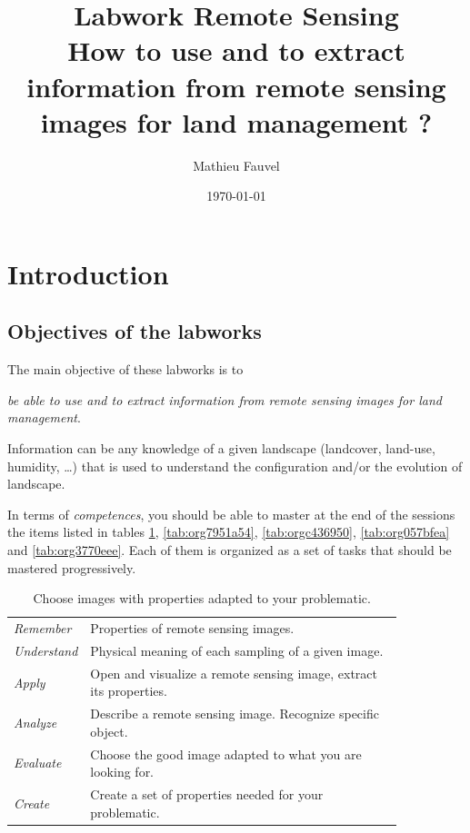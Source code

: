 \documentclass[a4paper,11pt,DIV=18]{scrartcl}
\author{Mathieu Fauvel}
\date{\today}
\title{Labwork Remote Sensing\\\medskip
\large How to use and to extract information from remote sensing images for land management ?}
\begin{document}
\maketitle
\setcounter{tocdepth}{2}
\tableofcontents

\section{Introduction}
\label{sec:org3ef3c04}
\subsection{Objectives of the labworks}
\label{sec:org4323aba}
The main objective of these labworks is to
\begin{center}
\emph{be able to  use and to extract information from  remote sensing images
for land management}.
\end{center}
Information  can be  any knowledge  of a  given landscape  (landcover,
land-use, humidity, \ldots{})  that is used to understand the configuration
and/or the evolution of landscape.

In terms of  \emph{competences}, you should be  able to master at  the end of
the sessions  the items listed in  tables \ref{tab:org80b3081}, \ref{tab:org7951a54}, \ref{tab:orgc436950},  \ref{tab:org057bfea} and \ref{tab:org3770eee}.
Each of them  is organized as a  set of tasks that  should be mastered
progressively.

\begin{table}[htbp]
\caption{\label{tab:org80b3081}
Choose images with properties adapted to your problematic.}
\centering
\begin{tabular}{lp{0.85\linewidth}}
\toprule
\emph{Remember} & Properties of remote sensing images.\\
\emph{Understand} & Physical meaning of each sampling of a given image.\\
\emph{Apply} & Open and visualize a remote sensing image, extract its properties.\\
\emph{Analyze} & Describe a remote sensing image. Recognize specific object.\\
\emph{Evaluate} & Choose the good image adapted to what you are looking for.\\
\emph{Create} & Create a set of properties needed for your problematic.\\
\bottomrule
\end{tabular}
\end{table}
\end{document}

